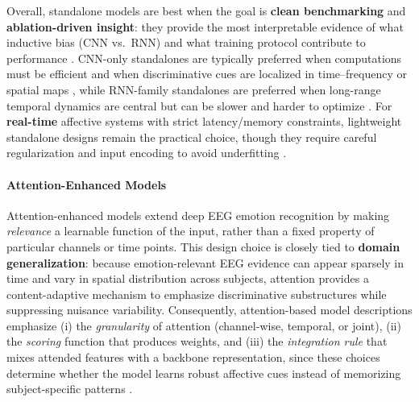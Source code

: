 \documentclass{WileyMSP-template}
\begin{document}
Overall, standalone models are best when the goal is \textbf{clean benchmarking} and \textbf{ablation-driven insight}: they provide the most interpretable evidence of what inductive bias (CNN vs.\ RNN) and what training protocol contribute to performance \cite{megger2019emotionr,nssuha2020eegbased}. CNN-only standalones are typically preferred when computations must be efficient and when discriminative cues are localized in time--frequency or spatial maps \cite{jcheng2021emotionr}, while RNN-family standalones are preferred when long-range temporal dynamics are central but can be slower and harder to optimize \cite{sliuxw2020subjecti}. For \textbf{real-time} affective systems with strict latency/memory constraints, lightweight standalone designs remain the practical choice, though they require careful regularization and input encoding to avoid underfitting \cite{sbwank2019ikknpred}.

\paragraph{Attention-Enhanced Models}
\label{sec:attention_enhanced_models}

Attention-enhanced models extend deep EEG emotion recognition by making \emph{relevance} a learnable function of the input, rather than a fixed property of particular channels or time points. This design choice is closely tied to \textbf{domain generalization}: because emotion-relevant EEG evidence can appear sparsely in time and vary in spatial distribution across subjects, attention provides a content-adaptive mechanism to emphasize discriminative substructures while suppressing nuisance variability. Consequently, attention-based model descriptions emphasize (i) the \emph{granularity} of attention (channel-wise, temporal, or joint), (ii) the \emph{scoring} function that produces weights, and (iii) the \emph{integration rule} that mixes attended features with a backbone representation, since these choices determine whether the model learns robust affective cues instead of memorizing subject-specific patterns \cite{hheand2019channela,jweijl2018learning,jxingk2018adaptive,yroyhb2019deeplear}.
\end{document}
